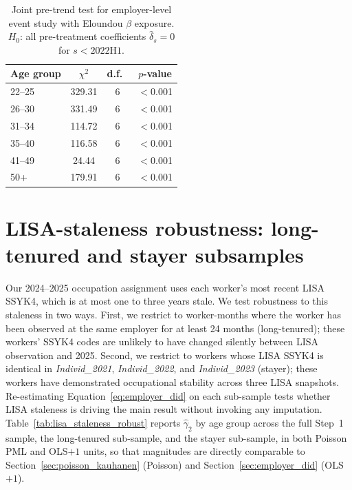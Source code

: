 \documentclass[preprint,12pt,authoryear]{elsarticle}
\begin{document}
\begin{table}[htbp]
\centering
\caption{Joint pre-trend test for employer-level event study with Eloundou $\beta$ exposure. $H_0$: all pre-treatment coefficients $\hat\delta_s = 0$ for $s < 2022\text{H1}$.}
\label{tab:eloundou_pretrend}
\footnotesize
\begin{tabular}{@{}lccc@{}}
\toprule
Age group & $\chi^2$ & d.f.\ & $p$-value \\
\midrule
22--25 & 329.31 & 6 & $<$0.001 \\
26--30 & 331.49 & 6 & $<$0.001 \\
31--34 & 114.72 & 6 & $<$0.001 \\
35--40 & 116.58 & 6 & $<$0.001 \\
41--49 &  24.44 & 6 & $<$0.001 \\
50+    & 179.91 & 6 & $<$0.001 \\
\bottomrule
\end{tabular}
\end{table}


\section{LISA-staleness robustness: long-tenured and stayer subsamples}
\label{sec:lisa_staleness_robust}

Our 2024--2025 occupation assignment uses each worker's most recent LISA SSYK4, which is at most one to three years stale. We test robustness to this staleness in two ways. First, we restrict to worker-months where the worker has been observed at the same employer for at least 24 months (long-tenured); these workers' SSYK4 codes are unlikely to have changed silently between LISA observation and 2025. Second, we restrict to workers whose LISA SSYK4 is identical in \textit{Individ\_2021}, \textit{Individ\_2022}, and \textit{Individ\_2023} (stayer); these workers have demonstrated occupational stability across three LISA snapshots. Re-estimating Equation~\ref{eq:employer_did} on each sub-sample tests whether LISA staleness is driving the main result without invoking any imputation. Table~\ref{tab:lisa_staleness_robust} reports $\hat\gamma_2$ by age group across the full Step~1 sample, the long-tenured sub-sample, and the stayer sub-sample, in both Poisson PML and OLS$+1$ units, so that magnitudes are directly comparable to Section~\ref{sec:poisson_kauhanen} (Poisson) and Section~\ref{sec:employer_did} (OLS$+1$).
\end{document}

